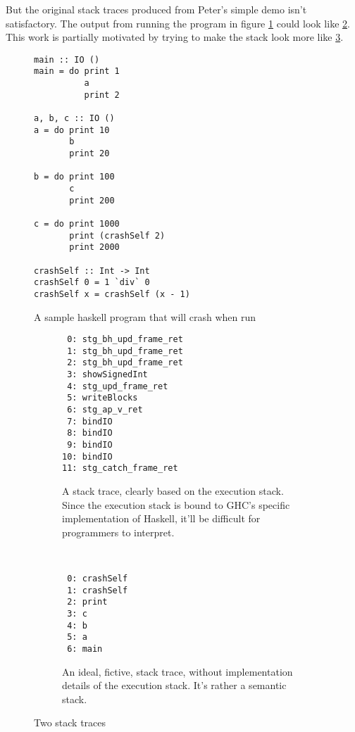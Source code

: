 But the original stack traces produced from Peter's simple demo
isn't satisfactory. The output from running the program in figure
\ref{fig:sample_program} could look like \ref{fig:trace_goal1}. This
work is partially motivated by trying to make the stack look more like
\ref{fig:trace_goal2}.

\begin{figure}
\begin{mdframed}
  \begin{verbatim}
main :: IO ()
main = do print 1
          a
          print 2

a, b, c :: IO ()
a = do print 10
       b
       print 20

b = do print 100
       c
       print 200

c = do print 1000
       print (crashSelf 2)
       print 2000

crashSelf :: Int -> Int
crashSelf 0 = 1 `div` 0
crashSelf x = crashSelf (x - 1)
  \end{verbatim}
  \caption{A sample haskell program that will crash when run}
  \label{fig:sample_program}
\end{mdframed}
\end{figure}




\begin{figure}
\begin{mdframed}
  \begin{subfigure}[t]{0.5\textwidth}
    {\small
    \begin{verbatim}
 0: stg_bh_upd_frame_ret
 1: stg_bh_upd_frame_ret
 2: stg_bh_upd_frame_ret
 3: showSignedInt
 4: stg_upd_frame_ret
 5: writeBlocks
 6: stg_ap_v_ret
 7: bindIO
 8: bindIO
 9: bindIO
10: bindIO
11: stg_catch_frame_ret
    \end{verbatim}
  }%
    \caption{A stack trace, clearly based on the execution stack. Since the
      execution stack is bound to GHC's specific implementation of Haskell,
      it'll be difficult for programmers to interpret.}
    \label{fig:trace_goal1}
  \end{subfigure}
        ~ %
        \begin{subfigure}[t]{0.5\textwidth}
    {\small
          \begin{verbatim}
 0: crashSelf
 1: crashSelf
 2: print
 3: c
 4: b
 5: a
 6: main
          \end{verbatim}
  }%
          \caption{An ideal, fictive, stack trace, without
          implementation details of the execution stack. It's rather a
          semantic stack.}
          \label{fig:trace_goal2}
        \end{subfigure}
        \caption{Two stack traces
        }\label{fig:traces}
\end{mdframed}
\end{figure}

